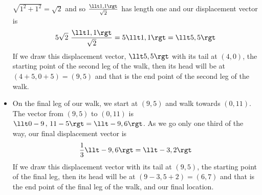 \begin{eg}
\begin{itemize}
$\sqrt{1^2+1^2}=\sqrt{2}$ and so $\frac{\llt 1,1\rgt}{\sqrt{2}}$ has length one
and our displacement vector is
\begin{equation*}
5\sqrt{2}\ \frac{\llt 1,1\rgt}{\sqrt{2}}
=5 \llt 1,1\rgt 
=\llt 5,5\rgt
\end{equation*}
If we draw this displacement vector, $\llt 5,5\rgt$ with its tail at 
$(4,0)$, the starting point of the second leg of the walk, then its head 
will be at $(4+5, 0+5)=(9,5)$ and that is the end point of the second 
leg of the walk.
\item
On the final leg of our walk, we start at $(9,5)$ and walk towards $(0,11)$.
The vector from $(9,5)$ to $(0,11)$ is $\llt 0-9\,,\,11-5\rgt =\llt -9,6\rgt$.
As we go only one third of the way, our final displacement vector is
\begin{equation*}
\frac{1}{3}\llt -9,6\rgt
=\llt -3,2\rgt
\end{equation*}
If we draw this displacement vector with its tail at 
$(9,5)$, the starting point of the final leg, then its head 
will be at $(9-3, 5+2)=(6,7)$ and that is the end point of the final
leg of the walk, and our final location.
\end{itemize}
\end{eg}


